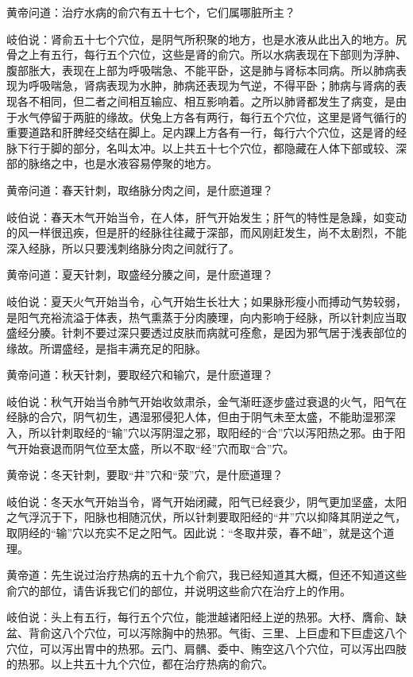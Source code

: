 \documentclass[12pt,UTF8]{ctexbook}
\begin{document}
黄帝问道：治疗水病的俞穴有五十七个，它们属哪脏所主？

岐伯说：肾俞五十七个穴位，是阴气所积聚的地方，也是水液从此出入的地方。尻骨之上有五行，每行五个穴位，这些是肾的俞穴。所以水病表现在下部则为浮肿、腹部胀大，表现在上部为呼吸喘急、不能平卧，这是肺与肾标本同病。所以肺病表现为呼吸喘急，肾病表现为水肿，肺病还表现为气逆，不得平卧；肺病与肾病的表现各不相同，但二者之间相互输应、相互影响着。之所以肺肾都发生了病变，是由于水气停留于两脏的缘故。伏兔上方各有两行，每行五个穴位，这里是肾气循行的重要道路和肝脾经交结在脚上。足内踝上方各有一行，每行六个穴位，这是肾的经脉下行于脚的部分，名叫太冲。以上共五十七个穴位，都隐藏在人体下部或较、深部的脉络之中，也是水液容易停聚的地方。

黄帝问道：春天针刺，取络脉分肉之间，是什麽道理？

岐伯说：春天木气开始当令，在人体，肝气开始发生；肝气的特性是急躁，如变动的风一样很迅疾，但是肝的经脉往往藏于深部，而风刚赶发生，尚不太剧烈，不能深入经脉，所以只要浅刺络脉分肉之间就行了。

黄帝问道：夏天针刺，取盛经分腠之间，是什麽道理？

岐伯说：夏天火气开始当令，心气开始生长壮大；如果脉形瘦小而搏动气势较弱，是阳气充裕流溢于体表，热气熏蒸于分肉腠理，向内影响于经脉，所以针刺应当取盛经分腠。针刺不要过深只要透过皮肤而病就可痊愈，是因为邪气居于浅表部位的缘故。所谓盛经，是指丰满充足的阳脉。

黄帝问道：秋天针刺，要取经穴和输穴，是什麽道理？

岐伯说：秋气开始当令肺气开始收敛肃杀，金气渐旺逐步盛过衰退的火气，阳气在经脉的合穴，阴气初生，遇湿邪侵犯人体，但由于阴气未至太盛，不能助湿邪深入，所以针刺取经的“输”穴以泻阴湿之邪，取阳经的“合”穴以泻阳热之邪。由于阳气开始衰退而阴气位至太盛，所以不取“经”穴而取“合”穴。

黄帝说：冬天针刺，要取“井”穴和“荥”穴，是什麽道理？

岐伯说：冬天水气开始当令，肾气开始闭藏，阳气已经衰少，阴气更加坚盛，太阳之气浮沉于下，阳脉也相随沉伏，所以针刺要取阳经的“井”穴以抑降其阴逆之气，取阴经的“输”穴以充实不足之阳气。因此说：“冬取井荥，春不衄”，就是这个道理。

黄帝道：先生说过治疗热病的五十九个俞穴，我已经知道其大概，但还不知道这些俞穴的部位，请告诉我它们的部位，并说明这些俞穴在治疗上的作用。

岐伯说：头上有五行，每行五个穴位，能泄越诸阳经上逆的热邪。大杼、膺俞、缺盆、背俞这八个穴位，可以泻除胸中的热邪。气街、三里、上巨虚和下巨虚这八个穴位，可以泻出胃中的热邪。云门、肩髃、委中、贿空这八个穴位，可以泻出四肢的热邪。以上共五十九个穴位，都在治疗热病的俞穴。
\end{document}
